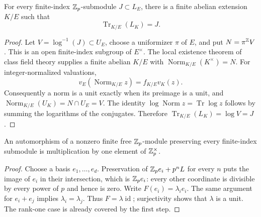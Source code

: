 \begin{lemma}
\label{lem:norm-sublattice}
For every finite-index $\mathbb Z_p$-submodule $J\subset L_E$, there is a
finite abelian extension $K/E$ such that
\[
 \operatorname{Tr}_{K/E}(L_K)=J.
\]
\end{lemma}
\begin{proof}
Let $V=\log^{-1}(J)\subset U_E$, choose a uniformizer $\pi$ of $E$, and
put $N=\pi^{\mathbb Z}V$. This is an open finite-index subgroup of $E^\times$.
The local existence theorem of class field theory
\cite[Chapter~I, Theorem~1.4]{MilneCFT} supplies a finite abelian $K/E$
with $\operatorname{Norm}_{K/E}(K^\times)=N$. For integer-normalized
valuations,
\[
 v_E(\operatorname{Norm}_{K/E}z)=f_{K/E}v_K(z).
\]
Consequently a norm is a unit exactly when its preimage is a unit, and
$\operatorname{Norm}_{K/E}(U_K)=N\cap U_E=V$.
The identity $\log\operatorname{Norm}z=\operatorname{Tr}\log z$ follows
by summing the logarithms of the conjugates. Therefore
$\operatorname{Tr}_{K/E}(L_K)=\log V=J$.
\end{proof}

\begin{lemma}\label{lem:sublattice-rigidity}
An automorphism of a nonzero finite free $\mathbb Z_p$-module preserving every
finite-index submodule is multiplication by one element of $\mathbb Z_p^\times$.
\end{lemma}
\begin{proof}
Choose a basis $e_1,\ldots,e_d$. Preservation of
$\mathbb Z_pe_i+p^nL$ for every $n$ puts the image of $e_i$ in their
intersection, which is $\mathbb Z_pe_i$: every other coordinate is divisible
by every power of $p$ and hence is zero. Write $F(e_i)=\lambda_i e_i$.
The same argument for $e_i+e_j$ implies $\lambda_i=\lambda_j$.
Thus $F=\lambda\operatorname{id}$; surjectivity shows that $\lambda$
is a unit. The rank-one case is already covered by the first step.
\end{proof}

